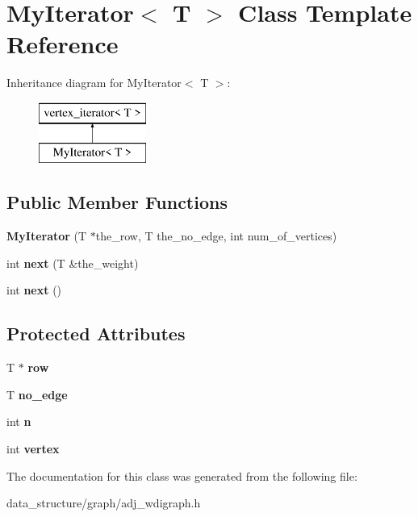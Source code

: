 \hypertarget{classMyIterator}{}\section{My\+Iterator$<$ T $>$ Class Template Reference}
\label{classMyIterator}
Inheritance diagram for My\+Iterator$<$ T $>$\+:\begin{figure}[H]
\begin{center}
\leavevmode
\includegraphics[height=2.000000cm]{classMyIterator}
\end{center}
\end{figure}
\subsection*{Public Member Functions}
\begin{DoxyCompactItemize}
\item 
\mbox{\label{classMyIterator_a99709c2c45130a8e6168f5c3bd67be9b}} 
{\bfseries My\+Iterator} (T $\ast$the\+\_\+row, T the\+\_\+no\+\_\+edge, int num\+\_\+of\+\_\+vertices)
\item 
\mbox{\label{classMyIterator_ab77bef399d57de966d653fa1ec124364}} 
int {\bfseries next} (T \&the\+\_\+weight)
\item 
\mbox{\label{classMyIterator_ac29886819292cd74b7db18b028d2dcd1}} 
int {\bfseries next} ()
\end{DoxyCompactItemize}
\subsection*{Protected Attributes}
\begin{DoxyCompactItemize}
\item 
\mbox{\label{classMyIterator_ac2d189e47545152bcfba72e5cb26c1e7}} 
T $\ast$ {\bfseries row}
\item 
\mbox{\label{classMyIterator_a9e27132c6a21661a77f0c572fe7d43e7}} 
T {\bfseries no\+\_\+edge}
\item 
\mbox{\label{classMyIterator_a274bd225f7d1aa8354942ac7b2f8a191}} 
int {\bfseries n}
\item 
\mbox{\label{classMyIterator_ab5eb1cfc4eb8e83362d9d10fd1a7449f}} 
int {\bfseries vertex}
\end{DoxyCompactItemize}


The documentation for this class was generated from the following file\+:\begin{DoxyCompactItemize}
\item 
data\+\_\+structure/graph/adj\+\_\+wdigraph.\+h\end{DoxyCompactItemize}
